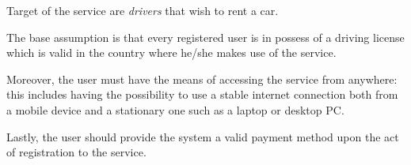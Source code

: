 Target of the service are \emph{drivers} that wish to rent a car.

The base assumption is that every registered user is in possess of a driving license which is valid in the country where he/she makes use of the service.

Moreover, the user must have the means of accessing the service from anywhere: this includes having the possibility to use a stable internet connection both from a mobile device and a stationary one such as a laptop or desktop PC.

Lastly, the user should provide the system a valid payment method upon the act of registration to the service.